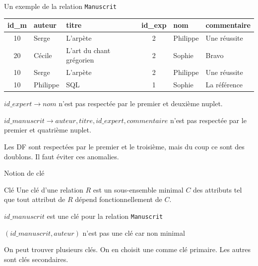 \begin{frame}{Un exemple de la relation \texttt{Manuscrit}}
 
\begin{small}
\begin{tabular}{c|l|p{4cm}|c|p{2cm}|p{3cm}}
\textbf{id\_m} & \textbf{auteur} & \textbf{titre} & \textbf{id\_exp}& \textbf{nom}& \textbf{commentaire} \\ \hline
   10& Serge&  L'arpète &2& Philippe & Une réussite\\
   20& Cécile& L'art du chant grégorien& 2& Sophie & Bravo\\
   10& Serge&  L'arpète &2& Philippe & Une réussite\\
   10& Philippe&  SQL &1& Sophie & La référence\\
\hline
\end{tabular}
\end{small}

\vfill
\begin{redbullet}
\item $id\_expert \to nom$ n'est pas respectée par le premier et deuxième
    nuplet.
    \item $id\_manuscrit \to auteur, titre, id\_expert, commentaire$ n'est pas respectée 
    par le premier et quatrième nuplet.
\end{redbullet}

\vfill

\begin{blocgauche}
Les DF sont respectées par le premier et le troisième, mais
du coup ce sont des \alert{doublons}. Il faut \alert{éviter}
ces anomalies.
\end{blocgauche}
\end{frame}

\begin{frame}{Notion de clé}


\begin{defblock}{Clé}
Une clé d'une relation $R$ est un sous-ensemble \alert{minimal} $C$
des attributs tel que tout attribut de $R$ dépend fonctionnellement de $C$. 
\end{defblock}
\vfill

\begin{redbullet}
  \item $id\_manuscrit$ est une clé pour la relation \texttt{Manuscrit}  
 \item $(id\_manuscrit, auteur)$ n'est pas une clé car non minimal
\end{redbullet}

\vfill
\begin{blocgauche}
On peut trouver plusieurs clés. On en choisit une comme \alert{clé primaire}.
Les autres sont clés secondaires.
\end{blocgauche}
\end{frame}



